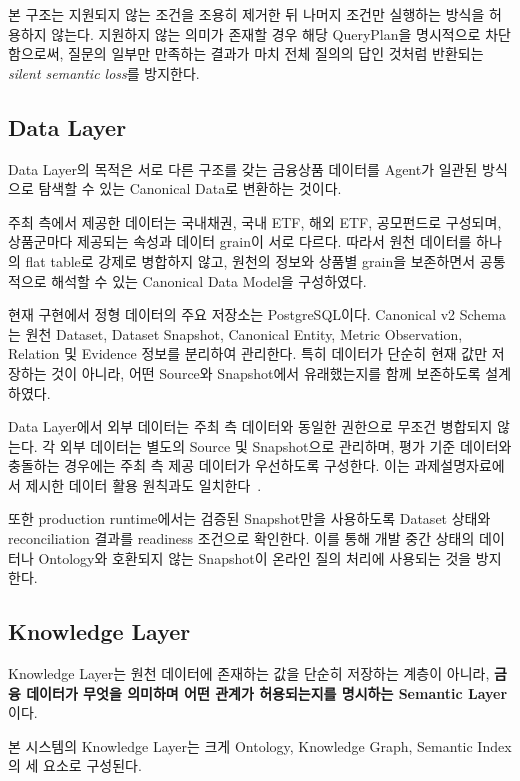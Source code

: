 \documentclass[11pt,a4paper]{article}
\begin{document}
본 구조는 지원되지 않는 조건을 조용히 제거한 뒤
나머지 조건만 실행하는 방식을 허용하지 않는다.
지원하지 않는 의미가 존재할 경우 해당 QueryPlan을 명시적으로 차단함으로써,
질문의 일부만 만족하는 결과가 마치 전체 질의의 답인 것처럼 반환되는
\textit{silent semantic loss}를 방지한다.


\subsection{Data Layer}

Data Layer의 목적은
서로 다른 구조를 갖는 금융상품 데이터를
Agent가 일관된 방식으로 탐색할 수 있는
Canonical Data로 변환하는 것이다.

주최 측에서 제공한 데이터는
국내채권, 국내 ETF, 해외 ETF, 공모펀드로 구성되며,
상품군마다 제공되는 속성과 데이터 grain이 서로 다르다.
따라서 원천 데이터를 하나의 flat table로 강제로 병합하지 않고,
원천의 정보와 상품별 grain을 보존하면서
공통적으로 해석할 수 있는 Canonical Data Model을 구성하였다.

현재 구현에서 정형 데이터의 주요 저장소는 PostgreSQL이다.
Canonical v2 Schema는 원천 Dataset,
Dataset Snapshot,
Canonical Entity,
Metric Observation,
Relation 및 Evidence 정보를 분리하여 관리한다.
특히 데이터가 단순히 현재 값만 저장하는 것이 아니라,
어떤 Source와 Snapshot에서 유래했는지를 함께 보존하도록 설계하였다.

Data Layer에서 외부 데이터는
주최 측 데이터와 동일한 권한으로 무조건 병합되지 않는다.
각 외부 데이터는 별도의 Source 및 Snapshot으로 관리하며,
평가 기준 데이터와 충돌하는 경우에는
주최 측 제공 데이터가 우선하도록 구성한다.
이는 과제설명자료에서 제시한 데이터 활용 원칙과도 일치한다~\cite[6쪽]{mirae-task}.

또한 production runtime에서는
검증된 Snapshot만을 사용하도록
Dataset 상태와 reconciliation 결과를 readiness 조건으로 확인한다.
이를 통해 개발 중간 상태의 데이터나
Ontology와 호환되지 않는 Snapshot이
온라인 질의 처리에 사용되는 것을 방지한다.


\subsection{Knowledge Layer}

Knowledge Layer는 원천 데이터에 존재하는 값을
단순히 저장하는 계층이 아니라,
\textbf{금융 데이터가 무엇을 의미하며
어떤 관계가 허용되는지를 명시하는 Semantic Layer}이다.

본 시스템의 Knowledge Layer는 크게
Ontology,
Knowledge Graph,
Semantic Index의 세 요소로 구성된다.
\end{document}
